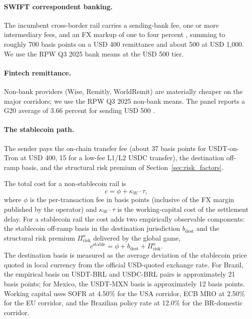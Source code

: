 \paragraph{SWIFT correspondent banking.} The incumbent cross-border rail carries a sending-bank fee, one or more intermediary fees, and an FX markup of one to four percent \citep{cpmi_2018_cross_border_retail}, summing to roughly 700 basis points on a USD 400 remittance and about 500 at USD 1{,}000. We use the RPW Q3 2025 bank means at the USD 500 tier.

\paragraph{Fintech remittance.} Non-bank providers (Wise, Remitly, WorldRemit) are materially cheaper on the major corridors; we use the RPW Q3 2025 non-bank means. The panel reports a G20 average of 3.66 percent for sending USD 500 \citep{rpw_q3_2025}.

\paragraph{The stablecoin path.} The sender pays the on-chain transfer fee (about 37 basis points for USDT-on-Tron at USD 400, 15 for a low-fee L1/L2 USDC transfer), the destination off-ramp basis, and the structural risk premium of Section~\ref{sec:risk_factors}.

The total cost for a non-stablecoin rail is
\begin{equation}\label{eq:total_cost_nonstable}
c = \phi + \kappa_W \cdot \tau,
\end{equation}
where $\phi$ is the per-transaction fee in basis points (inclusive of the FX margin published by the operator) and $\kappa_W \cdot \tau$ is the working-capital cost of the settlement delay. For a stablecoin rail the cost adds two empirically observable components: the stablecoin off-ramp basis in the destination jurisdiction $b_{\text{dest}}$ and the structural risk premium $\Pi_{\text{risk}}^{a}$ delivered by the global game,
\begin{equation}\label{eq:total_cost_stable}
c^{\text{stable}} = \phi + b_{\text{dest}} + \Pi_{\text{risk}}^{a}.
\end{equation}
The destination basis is measured as the average deviation of the stablecoin price quoted in local currency from the official USD-quoted exchange rate. For Brazil, the empirical basis on USDT-BRL and USDC-BRL pairs is approximately 21 basis points; for Mexico, the USDT-MXN basis is approximately 12 basis points. Working capital uses SOFR at 4.50\% for the USA corridor, ECB MRO at 2.50\% for the EU corridor, and the Brazilian policy rate at 12.0\% for the BR-domestic corridor.

